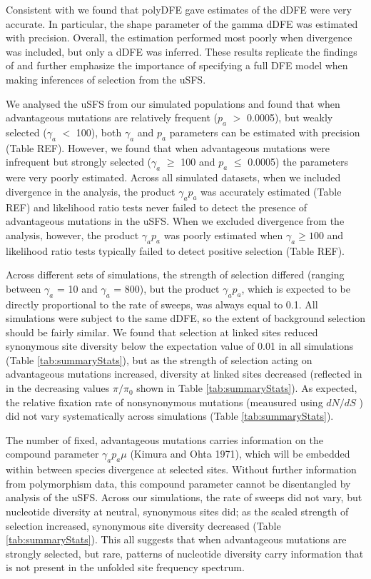 	Consistent with \cite{RN354}  we found that polyDFE gave estimates of the dDFE were very accurate. In particular, the shape parameter of the gamma dDFE was estimated with precision. Overall, the estimation performed most poorly when divergence was included, but only a dDFE was inferred. These results replicate the findings of \cite{RN354} and further emphasize the importance of specifying a full DFE model when making inferences of selection from the uSFS. 
	
	 We analysed the uSFS from our simulated populations and found that when advantageous mutations are relatively frequent ($p_a$ $>$ 0.0005), but weakly selected ($\gamma_a$ $<$ 100), both $\gamma_a$ and $p_a$ parameters can be estimated with precision (Table REF). However, we found that when advantageous mutations were infrequent but strongly selected ($\gamma_a$ $\geq$ 100 and $p_a$ $\leq$ 0.0005) the parameters were very poorly estimated. Across all simulated datasets, when we included divergence in the analysis, the product $\gamma_a p_a$ was accurately estimated (Table REF) and likelihood ratio tests never failed to detect the presence of advantageous mutations in the uSFS. When we excluded divergence from the analysis, however, the product  $\gamma_a p_a$  was poorly estimated when $\gamma_a \geq 100$ and likelihood ratio tests typically failed to detect positive selection (Table REF).
	
	Across different sets of simulations, the strength of selection differed (ranging between $\gamma_a$ = 10 and $\gamma_a$ = 800), but the product $\gamma_a p_a$, which is expected to be directly proportional to the rate of sweeps, was always equal to 0.1. All simulations were subject to the same dDFE, so the extent of background selection should be fairly similar. We found that selection at linked sites reduced synonymous site diversity below the expectation value of 0.01 in all simulations (Table \ref{tab:summaryStats}),  but as the strength of selection acting on advantageous mutations increased, diversity at linked sites decreased (reflected in in the decreasing values $\pi/\pi_0$ shown in Table \ref{tab:summaryStats}). As expected, the relative fixation rate of nonsynonymous mutations (meausured using  $dN/dS$ ) did not vary systematically across simulations (Table \ref{tab:summaryStats}).
	
	The number of fixed, advantageous mutations carries information on the compound parameter $\gamma_a p_a \mu$ (Kimura and Ohta 1971), which will be embedded within between species divergence at selected sites. Without further information from polymorphism data, this compound parameter cannot be disentangled by analysis of the uSFS. Across our simulations, the rate of sweeps did not vary, but nucleotide diversity at neutral, synonymous sites did; as the scaled strength of selection increased, synonymous site diversity decreased (Table \ref{tab:summaryStats}). This all suggests that when advantageous mutations are strongly selected, but rare, patterns of nucleotide diversity carry information that is not present in the unfolded site frequency spectrum.

